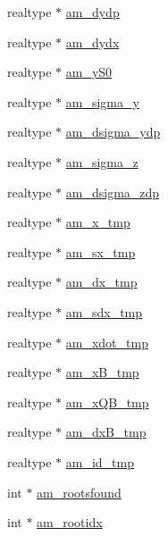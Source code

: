 \begin{DoxyCompactItemize}
\item 
realtype $\ast$ \hyperlink{struct_temp_data_a76083cb4a9598daa381dbaa9c17aadc6}{am\+\_\+dydp}
\item 
realtype $\ast$ \hyperlink{struct_temp_data_a062c7ecfd4107b320dfd2fc0e4211a6b}{am\+\_\+dydx}
\item 
realtype $\ast$ \hyperlink{struct_temp_data_a7c1a4e54905d0fea6c4ec952cd7a96d8}{am\+\_\+y\+S0}
\item 
realtype $\ast$ \hyperlink{struct_temp_data_ac152c0012fafda7a5ec5f2163eebfcda}{am\+\_\+sigma\+\_\+y}
\item 
realtype $\ast$ \hyperlink{struct_temp_data_a27781d18ccc799ac0074d2dc39d51abc}{am\+\_\+dsigma\+\_\+ydp}
\item 
realtype $\ast$ \hyperlink{struct_temp_data_a6326bdfdde6ff9d3e52a80760e403a02}{am\+\_\+sigma\+\_\+z}
\item 
realtype $\ast$ \hyperlink{struct_temp_data_ad918e459ea613f39e2d2a2fe62b68137}{am\+\_\+dsigma\+\_\+zdp}
\item 
realtype $\ast$ \hyperlink{struct_temp_data_a7751aebb2b290fc4a51d9ca5f47fb455}{am\+\_\+x\+\_\+tmp}
\item 
realtype $\ast$ \hyperlink{struct_temp_data_a4b0bde10a390f324386b07acacd367bc}{am\+\_\+sx\+\_\+tmp}
\item 
realtype $\ast$ \hyperlink{struct_temp_data_abd683baa60bb69c9731961ba50e1455d}{am\+\_\+dx\+\_\+tmp}
\item 
realtype $\ast$ \hyperlink{struct_temp_data_ac0bc306224fbe129accbc959efda5451}{am\+\_\+sdx\+\_\+tmp}
\item 
realtype $\ast$ \hyperlink{struct_temp_data_ac28b5a5a19ad2004d32d20098d3603ed}{am\+\_\+xdot\+\_\+tmp}
\item 
realtype $\ast$ \hyperlink{struct_temp_data_a71147dc6b9970cafbada503f873d0dfe}{am\+\_\+x\+B\+\_\+tmp}
\item 
realtype $\ast$ \hyperlink{struct_temp_data_a18e2184588648670c2df22856f441e32}{am\+\_\+x\+Q\+B\+\_\+tmp}
\item 
realtype $\ast$ \hyperlink{struct_temp_data_a147fbb5ac85bc9ce0f55cb9108663e1b}{am\+\_\+dx\+B\+\_\+tmp}
\item 
realtype $\ast$ \hyperlink{struct_temp_data_af4cb4bb8ec3396d46cca992ad83ae137}{am\+\_\+id\+\_\+tmp}
\item 
int $\ast$ \hyperlink{struct_temp_data_a7aead84117fd84087a23d968ea56b542}{am\+\_\+rootsfound}
\item 
int $\ast$ \hyperlink{struct_temp_data_a360ea220e712750c92bd3fc8b56230e2}{am\+\_\+rootidx}

\end{DoxyCompactItemize}
